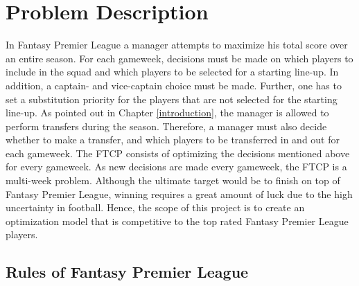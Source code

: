 
\chapter{Problem Description}
In Fantasy Premier League a manager attempts to maximize his total score over an entire season. For each gameweek, decisions must be made on which players to include in the squad and which players to be selected for a starting line-up. In addition, a captain- and vice-captain choice must be made. Further, one has to set a substitution priority for the players that are not selected for the starting line-up. As pointed out in Chapter \ref{introduction}, the manager is allowed to perform transfers during the season. Therefore, a manager must also decide whether to make a transfer, and which players to be transferred in and out for each gameweek.
\newpar
The FTCP consists of optimizing the decisions mentioned above for every gameweek. As new decisions are made every gameweek, the FTCP is a multi-week problem. Although the ultimate target would be to finish on top of Fantasy Premier League, winning requires a great amount of luck due to the high uncertainty in football. Hence, the scope of this project is to create an optimization model that is competitive to the top rated Fantasy Premier League players. 

\section{Rules of Fantasy Premier League} \label{rules of fpl}

